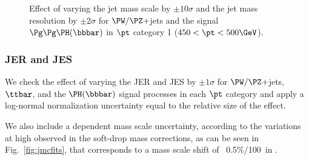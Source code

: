 \begin{figure}[hbtp]\centering
    \\
    \\
	\caption{Effect of varying the jet mass scale by $\pm10\sigma$ and the jet mass resolution by $\pm2\sigma$ for $\PW/\PZ+$jets and the signal $\Pg\Pg\PH(\bbbar)$ in $\pt$ category 1 ($450< \pt < 500 \GeV$).}
	\label{fig:scalesmear_WZH}
\end{figure}


\subsubsection{JER and JES}
\label{sec:sysJERJES}

We check the effect of varying the JER and JES by $\pm1\sigma$ for $\PW/\PZ+$jets, $\ttbar$, and the $\PH(\bbbar)$ signal processes in each $\pt$ category and apply a log-normal normalization uncertainty equal to the relative size of the effect.

We also include a \pt dependent mass scale uncertainty, according to the variations at high \pt observed in the soft-drop mass corrections, as can be seen in Fig.~\ref{fig:jmcfits}, that corresponds to a mass scale shift of ~0.5\%/100~\GeV in \pt.



